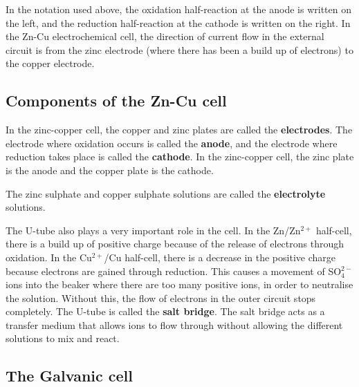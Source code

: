 In the notation used above, the oxidation half-reaction at the anode is written on the left, and the reduction half-reaction at the cathode is written on the right. In the Zn-Cu electrochemical cell, the direction of current flow in the external circuit is from the zinc electrode (where there has been a build up of electrons) to the copper electrode.

 
\subsection{Components of the Zn-Cu cell}

In the zinc-copper cell, the copper and zinc plates are called the \textbf{electrodes}. The electrode where oxidation occurs is called the \textbf{anode}, and the electrode where reduction takes place is called the \textbf{cathode}. In the zinc-copper cell, the zinc plate is the anode and the copper plate is the cathode.


The zinc sulphate and copper sulphate solutions are called the \textbf{electrolyte} solutions.


The U-tube also plays a very important role in the cell. In the Zn/Zn$^{2+}$ half-cell, there is a build up of positive charge because of the release of electrons through oxidation. In the Cu$^{2+}$/Cu half-cell, there is a decrease in the positive charge because electrons are gained through reduction. This causes a movement of SO$_{4}^{2-}$ ions into the beaker where there are too many positive ions, in order to neutralise the solution. Without this, the flow of electrons in the outer circuit stops completely. The U-tube is called the \textbf{salt bridge}. The salt bridge acts as a transfer medium that allows ions to flow through without allowing the different solutions to mix and react. 


\subsection{The Galvanic cell}


